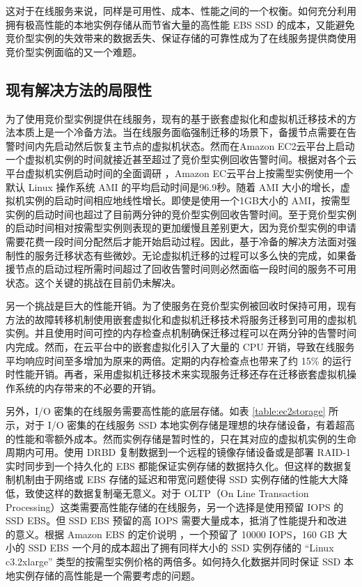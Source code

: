 这对于在线服务来说，同样是可用性、成本、性能之间的一个权衡。如何充分利用拥有极高性能的本地实例存储从而节省大量的高性能 EBS SSD 的成本，又能避免竞价型实例的失效带来的数据丢失、保证存储的可靠性成为了在线服务提供商使用竞价型实例面临的又一个难题。
\subsection{现有解决方法的局限性}
\label{sec:gemini_challenges}
为了使用竞价型实例提供在线服务，现有的基于嵌套虚拟化和虚拟机迁移技术的方法\cite{He:2015:CCH:2749246.2749275}本质上是一个冷备方法。当在线服务面临强制迁移的场景下，备援节点需要在告警时间内先启动然后恢复主节点的虚拟机状态。然而在Amazon EC2云平台上启动一个虚拟机实例的时间就接近甚至超过了竞价型实例回收告警时间。根据对各个云平台虚拟机实例启动时间的全面调研 \cite{Mao:2012:PSV:2353730.2353859}，Amazon EC云平台上按需型实例使用一个默认 Linux 操作系统 AMI 的平均启动时间是96.9秒。随着 AMI 大小的增长，虚拟机实例的启动时间相应地线性增长。即使是使用一个1GB大小的 AMI，按需型实例的启动时间也超过了目前两分钟的竞价型实例回收告警时间。至于竞价型实例的启动时间相对按需型实例则表现的更加缓慢且差别更大，因为竞价型实例的申请需要花费一段时间分配然后才能开始启动过程。因此，基于冷备的解决方法面对强制性的服务迁移状态有些微妙。无论虚拟机迁移的过程可以多么快的完成，如果备援节点的启动过程所需时间超过了回收告警时间则必然面临一段时间的服务不可用状态。这个关键的挑战在目前仍未解决。

另一个挑战是巨大的性能开销。为了使服务在竞价型实例被回收时保持可用，现有方法的故障转移机制使用嵌套虚拟化和虚拟机迁移技术将服务迁移到可用的虚拟机实例。并且使用时间可控的内存检查点机制确保迁移过程可以在两分钟的告警时间内完成。然而，在云平台中的嵌套虚拟化引入了大量的 CPU 开销，导致在线服务平均响应时间至多增加为原来的两倍。定期的内存检查点也带来了约 15\% 的运行时性能开销。再者，采用虚拟机迁移技术来实现服务迁移还存在迁移嵌套虚拟机操作系统的内存带来的不必要的开销。

另外，I/O 密集的在线服务需要高性能的底层存储。如表 \ref{table:ec2storage} 所示，对于 I/O 密集的在线服务 SSD 本地实例存储是理想的块存储设备，有着超高的性能和零额外成本。然而实例存储是暂时性的，只在其对应的虚拟机实例的生命周期内可用。使用 DRBD 复制数据到一个远程的镜像存储设备或是部署 RAID-1 实时同步到一个持久化的 EBS 都能保证实例存储的数据持久化。但这样的数据复制机制由于网络或 EBS 存储的延迟和带宽问题使得 SSD 实例存储的性能大大降低，致使这样的数据复制毫无意义。对于 OLTP（On Line Transaction Processing）这类需要高性能存储的在线服务，另一个选择是使用预留 IOPS 的 SSD EBS。但 SSD EBS 预留的高 IOPS 需要大量成本，抵消了性能提升和改进的意义。根据 Amazon EBS 的定价说明 \cite{EBSPricing:2015}，一个预留了 10000 IOPS，160 GB 大小的 SSD EBS 一个月的成本超出了拥有同样大小的 SSD 实例存储的 ``Linux c3.2xlarge'' 类型的按需型实例价格的两倍多。如何持久化数据并同时保证 SSD 本地实例存储的高性能是一个需要考虑的问题。


